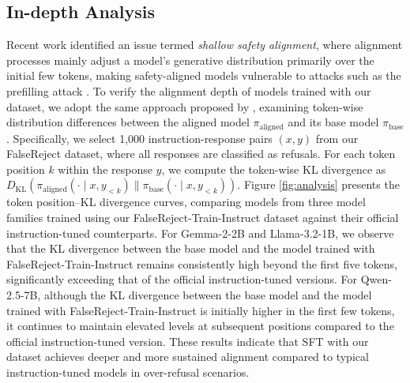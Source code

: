 \documentclass{article} %
\begin{document}
\subsection{In-depth Analysis}
Recent work \citep{qi2024safety} identified an issue termed \textit{shallow safety alignment}, where alignment processes mainly adjust a model's generative distribution primarily over the initial few tokens, making safety-aligned models vulnerable to attacks such as the prefilling attack \citep{zou2023universal}. To verify the alignment depth of models trained with our dataset, we adopt the same approach proposed by \citet{qi2024safety}, examining token-wise distribution differences between the aligned model \(\pi_{\text{aligned}}\) and its base model \(\pi_{\text{base}}\). Specifically, we select 1,000 instruction-response pairs \((x, y)\) from our FalseReject dataset, where all responses are classified as refusals. For each token position \(k\) within the response \(y\), we compute the token-wise KL divergence as \( D_{\text{KL}}\left(\pi_{\text{aligned}}(\cdot \mid x, y_{<k}) \parallel \pi_{\text{base}}(\cdot \mid x, y_{<k})\right) \). Figure \ref{fig:analysis} presents the token position–KL divergence curves, comparing models from three model families trained using our FalseReject-Train-Instruct dataset against their official instruction-tuned counterparts. For Gemma-2-2B and Llama-3.2-1B, we observe that the KL divergence between the base model and the model trained with FalseReject-Train-Instruct remains consistently high beyond the first five tokens, significantly exceeding that of the official instruction-tuned versions. For Qwen-2.5-7B, although the KL divergence between the base model and the model trained with FalseReject-Train-Instruct is initially higher in the first few tokens, it continues to maintain elevated levels at subsequent positions compared to the official instruction-tuned version. These results indicate that SFT with our dataset achieves deeper and more sustained alignment compared to typical instruction-tuned models in over-refusal scenarios.
\end{document}
